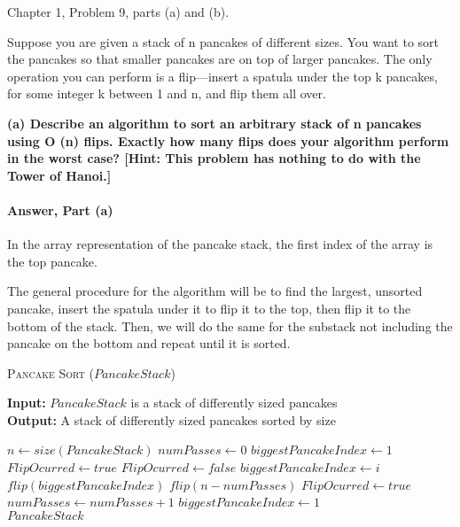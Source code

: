 \documentclass{article}
\begin{document}
\collab{\todo{}}

Chapter 1, Problem 9, parts (a) and (b).

Suppose you are given a stack of n pancakes of different sizes. You want to
sort the pancakes so that smaller pancakes are on top of larger pancakes.
The only operation you can perform is a flip—insert a spatula under the
top k pancakes, for some integer k between 1 and n, and flip them all over.

{\bf (a) Describe an algorithm to sort an arbitrary stack of n pancakes using
O (n) flips. Exactly how many flips does your algorithm perform in the
worst case? [Hint: This problem has nothing to do with the Tower of
Hanoi.]}

\paragraph{Answer, Part (a)}

In the array representation of the pancake stack, the first index of the array
is the top pancake.

The general procedure for the algorithm will be to find the largest, unsorted pancake,
insert the spatula under it to flip it to the top, then flip it to the bottom of the stack.
Then, we will do the same for the substack not including the pancake on the bottom and repeat until it is sorted.

\begin{algorithm} \caption{\textsc{Pancake Sort} ($PancakeStack$)}\label{alg:seb}
    {\bf Input:} $PancakeStack$ is a stack of differently sized pancakes\\
    {\bf Output:} A stack of differently sized pancakes sorted by size
    \begin{algorithmic}[1]
        \State$n \gets size(PancakeStack)$
        \State$numPasses \gets 0$
        \State$biggestPancakeIndex \gets 1$
        \State$FlipOcurred \gets true$
        \State$FlipOcurred \gets false$
        \State$biggestPancakeIndex \gets i$
        \EndIf{}
        \EndFor{}
        \State$flip(biggestPancakeIndex)$
        \State$flip(n - numPasses)$
        \State$FlipOcurred \gets true$
        \EndIf{}
        \State$ numPasses \gets numPasses + 1$
        \State$biggestPancakeIndex \gets 1$
        \EndWhile{}\\
        \Return$PancakeStack$
    \end{algorithmic}
\end{algorithm}
\end{document}
